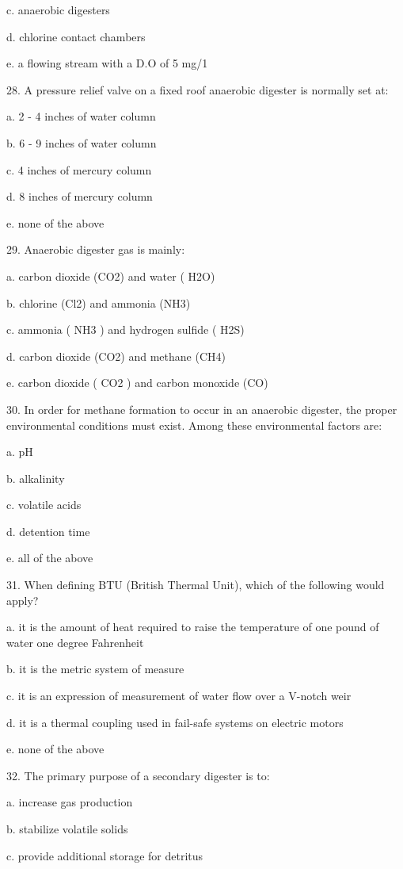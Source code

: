 \documentclass{article}
\begin{document}
c. anaerobic digesters 

d. chlorine contact chambers 

e. a flowing stream with a D.O of 5 mg/1 


28. A pressure relief valve on a fixed roof anaerobic digester is normally set at: 

a. 2 - 4 inches of water column 

b. 6 - 9 inches of water column 

c. 4 inches of mercury column 

d. 8 inches of mercury column 

e. none of the above 


29. Anaerobic digester gas is mainly: 

a. carbon dioxide (CO2) and water ( H2O) 

b. chlorine (Cl2) and ammonia (NH3) 

c. ammonia ( NH3 ) and hydrogen sulfide ( H2S) 

d. carbon dioxide (CO2) and methane (CH4) 

e. carbon dioxide ( CO2 ) and carbon monoxide (CO) 


30. In order for methane formation to occur in an anaerobic digester, the proper environmental conditions must exist. Among these environmental factors are: 

a. pH 

b. alkalinity 

c. volatile acids 

d. detention time 

e. all of the above 


31. When defining BTU (British Thermal Unit), which of the following would apply? 

a. it is the amount of heat required to raise the temperature of one pound of water one degree Fahrenheit 

b. it is the metric system of measure 

c. it is an expression of measurement of water flow over a V-notch weir 

d. it is a thermal coupling used in fail-safe systems on electric motors 

e. none of the above 


32. The primary purpose of a secondary digester is to: 

a. increase gas production 

b. stabilize volatile solids 

c. provide additional storage for detritus 
\end{document}
